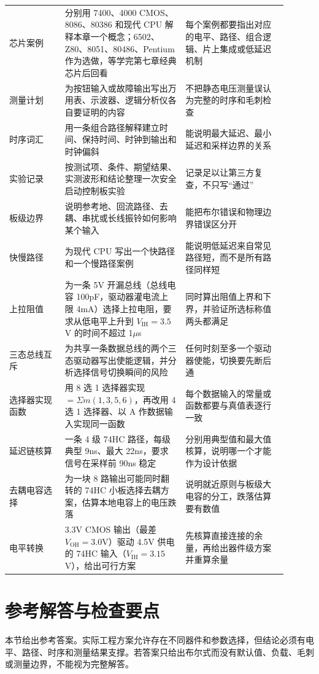\begin{longtable}{L{0.18\linewidth}L{0.39\linewidth}L{0.33\linewidth}}
芯片案例 & 分别用 7400、4000 CMOS、8086、80386 和现代 CPU 解释本章一个概念；6502、Z80、8051、80486、Pentium 作为选做，等学完第七章经典芯片后回看 & 每个案例都要指出对应的电平、路径、组合逻辑、片上集成或低延迟机制 \\
测量计划 & 为按钮输入或故障输出写出万用表、示波器、逻辑分析仪各自要证明的内容 & 不把静态电压测量误认为完整的时序和毛刺检查 \\
时序词汇 & 用一条组合路径解释建立时间、保持时间、时钟到输出和时钟偏斜 & 能说明最大延迟、最小延迟和采样边界的关系 \\
实验记录 & 按测试项、条件、期望结果、实测波形和结论整理一次安全启动控制板实验 & 记录足以让第三方复查，不只写“通过” \\
板级边界 & 说明参考地、回流路径、去耦、串扰或长线振铃如何影响某个输入 & 能把布尔错误和物理边界错误区分开 \\
快慢路径 & 为现代 CPU 写出一个快路径和一个慢路径案例 & 能说明低延迟来自常见路径短，而不是所有路径同样短 \\
上拉阻值 & 为一条 5V 开漏总线（总线电容 100pF，驱动器灌电流上限 4mA）选择上拉电阻，要求从低电平上升到 $V_\mathrm{IH}=3.5$V 的时间不超过 1$\mu$s & 同时算出阻值上界和下界，并验证所选标称值两头都满足 \\
三态总线互斥 & 为共享一条数据总线的两个三态驱动器写出使能逻辑，并分析选择信号切换瞬间的风险 & 任何时刻至多一个驱动器使能，切换要先断后通 \\
选择器实现函数 & 用 8 选 1 选择器实现 $=\Sigma m(1,3,5,6)$，再改用 4 选 1 选择器、以 A 作数据输入实现同一函数 & 每个数据输入的常量或函数都要与真值表逐行一致 \\
延迟链核算 & 一条 4 级 74HC 路径，每级典型 9ns、最大 22ns，要求信号在采样前 90ns 稳定 & 分别用典型值和最大值核算，说明哪一个才能作为设计依据 \\
去耦电容选择 & 为一块 8 路输出可能同时翻转的 74HC 小板选择去耦方案，估算本地电容上的电压跌落 & 说明就近原则与板级大电容的分工，跌落估算要有数值 \\
电平转换 & 3.3V CMOS 输出（最差 $V_\mathrm{OH}=3.0$V）驱动 4.5V 供电的 74HC 输入（$V_\mathrm{IH}=3.15$V），给出可行方案 & 先核算直接连接的余量，再给出器件级方案并重算余量 \\
\bottomrule
\end{longtable}

\section*{参考解答与检查要点}

本节给出参考答案。实际工程方案允许存在不同器件和参数选择，但结论必须有电平、路径、时序和测量结果支撑。若答案只给出布尔式而没有默认值、负载、毛刺或测量边界，不能视为完整解答。

